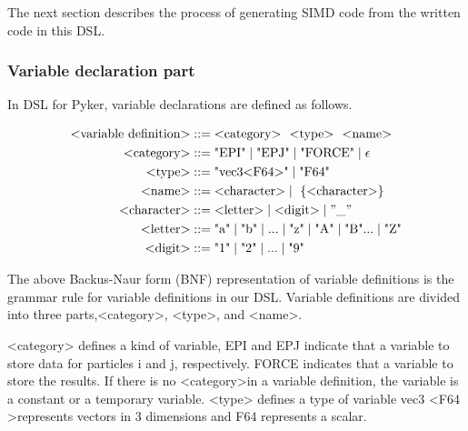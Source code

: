 \documentclass[ams]{article}
\begin{document}
The next section describes the process of generating SIMD code from the written code in this DSL.
\subsubsection{Variable declaration part}

In DSL for Pyker, variable declarations are defined as follows.

\begin{align*}
\text{\textless variable definition\textgreater} &::= \text{\textless category\textgreater\text{  }   \textless type\textgreater \text{  }  \textless name\textgreater} \\
\text{\textless category\textgreater} &::= \text{"EPI"} \mid \text{"EPJ"} \mid \text{"FORCE"} \mid \epsilon \\
\text{\textless type\textgreater} &::= \text{"vec3\textless F64\textgreater"} \mid \text{"F64"} \\
\text{\textless name\textgreater} &::= \text{\textless character\textgreater} \mid \text{ \{\textless character\textgreater \}}\\
\text{\textless character\textgreater} &::= \text{\textless letter\textgreater} \mid \text{\textless digit\textgreater} \mid "\_"\\
\text{\textless letter\textgreater} &::= \text{"a"} \mid \text{"b"} \mid ... \mid \text{"z"} \mid \text{"A"}\mid \text{"B"} ... \mid \text{"Z"}\\
\text{\textless digit\textgreater} &::= \text{"1"} \mid \text{"2"} \mid ... \mid \text{"9"} \\
\end{align*}

The above Backus-Naur form (BNF) representation of variable definitions is the grammar rule for variable definitions in our DSL.
Variable definitions are divided into three parts,\textless category\textgreater, \textless type\textgreater, and \textless name\textgreater.

\textless category\textgreater \text{ } defines a kind of variable, EPI and EPJ indicate that a variable to store data for particles i and j,
respectively. FORCE indicates that a variable to store the results. If there is no \textless category\textgreater in a variable definition, the variable is a constant or a temporary variable.
\textless type\textgreater \text{ } defines a type of variable
vec3 \textless F64 \textgreater represents vectors in 3 dimensions and F64 represents a scalar.
\end{document}

